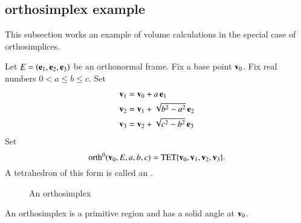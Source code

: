 \subsection{orthosimplex example}
%

This subsection works an example of volume calculations in the special
case of orthosimplices.

\begin{definition}[orthosimplex]\label{def:orth}  Let
$E=({\mathbf e}_1,{\mathbf e}_2,{\mathbf e}_3)$ be an orthonormal frame.  Fix a base point ${\mathbf v}_0$.
Fix real numbers  $0<a\le b \le c$.  Set
\begin{align*}
{\mathbf v}_1 &= {\mathbf v}_0 + a \,{\mathbf e}_1\\
{\mathbf v}_2 &= {\mathbf v}_1 + \sqrt{b^2-a^2}\, {\mathbf e}_2\\
{\mathbf v}_3 &= {\mathbf v}_2 + \sqrt{c^2-b^2} \,{\mathbf e}_3
\end{align*}
Set 
\[ {\operatorname{orth}}^0({\mathbf v}_0,E,a,b,c)={\operatorname{TET}}\{{\mathbf v}_0,{\mathbf v}_1,{\mathbf v}_2,{\mathbf v}_3\}.\]
A tetrahedron of this form is called an .
\end{definition}

\begin{figure}[htb]
\centering
\caption{An orthosimplex}
\label{fig:rogers}
\end{figure}

An orthosimplex is a
primitive region and has a solid angle at ${\mathbf v}_0$.

